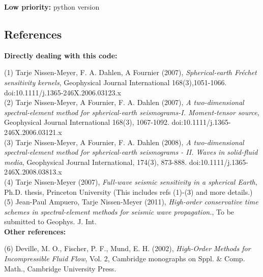 \documentclass[11pt,letter,fleqn,english,notitlepage]{article}
\begin{document}
\noindent\textbf{Low priority:} python version

\subsection{References}

\noindent \textbf{Directly dealing with this code:}\vspace*{0.2cm}

(1) Tarje Nissen-Meyer, F. A. Dahlen, A Fournier (2007),
\textit{Spherical-earth Fr\'{e}chet sensitivity kernels},        
Geophysical Journal International 168(3),1051-1066. 
doi:10.1111/j.1365-246X.2006.03123.x                \\
                                                        
(2) Tarje Nissen-Meyer, A Fournier, F. A. Dahlen (2007), 
\textit{A two-dimensional spectral-element method for
spherical-earth seismograms-I. Moment-tensor source}, 
Geophysical Journal International 168(3), 1067-1092. 
doi:10.1111/j.1365-246X.2006.03121.x                 \\
                                                       
(3) Tarje Nissen-Meyer, A Fournier, F. A. Dahlen (2008),  
\textit{A two-dimensional spectral-element method for   
spherical-earth seismograms - II. Waves in solid-fluid media},
Geophysical Journal International, 174(3), 873-888.
doi:10.1111/j.1365-246X.2008.03813.x\\

(4) Tarje Nissen-Meyer (2007),
\textit{Full-wave seismic sensitivity in a spherical Earth},
Ph.D. thesis, Princeton University
(This includes refs (1)-(3) and more details.)\\

(5) Jean-Paul Ampuero, Tarje Nissen-Meyer (2011),
\textit{High-order conservative time schemes in spectral-element methods 
for seismic wave propagation.}, To be submitted to Geophys. J. Int.\\


\noindent \textbf{Other references:}\vspace*{0.2cm}

(6) Deville, M. O., Fischer, P. F., Mund, E. H. (2002), 
\textit{High-Order Methods for Incompressible Fluid Flow}, 
Vol. 2, Cambridge monographs on Sppl. \& Comp. Math., Cambridge University Press.\\
\end{document}
